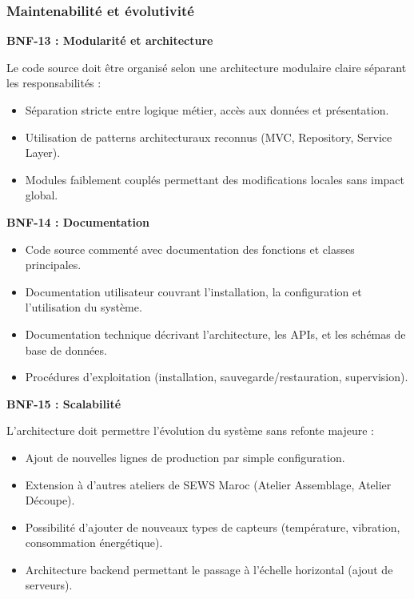 \subsubsection{Maintenabilité et évolutivité}

\textbf{BNF-13 : Modularité et architecture}

Le code source doit être organisé selon une architecture modulaire claire séparant les responsabilités :

\begin{itemize}
    \item Séparation stricte entre logique métier, accès aux données et présentation.
    \item Utilisation de patterns architecturaux reconnus (MVC, Repository, Service Layer).
    \item Modules faiblement couplés permettant des modifications locales sans impact global.
\end{itemize}

\textbf{BNF-14 : Documentation}

\begin{itemize}
    \item Code source commenté avec documentation des fonctions et classes principales.
    \item Documentation utilisateur couvrant l'installation, la configuration et l'utilisation du système.
    \item Documentation technique décrivant l'architecture, les APIs, et les schémas de base de données.
    \item Procédures d'exploitation (installation, sauvegarde/restauration, supervision).
\end{itemize}


\textbf{BNF-15 : Scalabilité}

L'architecture doit permettre l'évolution du système sans refonte majeure :

\begin{itemize}
    \item Ajout de nouvelles lignes de production par simple configuration.
    \item Extension à d'autres ateliers de SEWS Maroc (Atelier Assemblage, Atelier Découpe).
    \item Possibilité d'ajouter de nouveaux types de capteurs (température, vibration, consommation énergétique).
    \item Architecture backend permettant le passage à l'échelle horizontal (ajout de serveurs).
\end{itemize}

